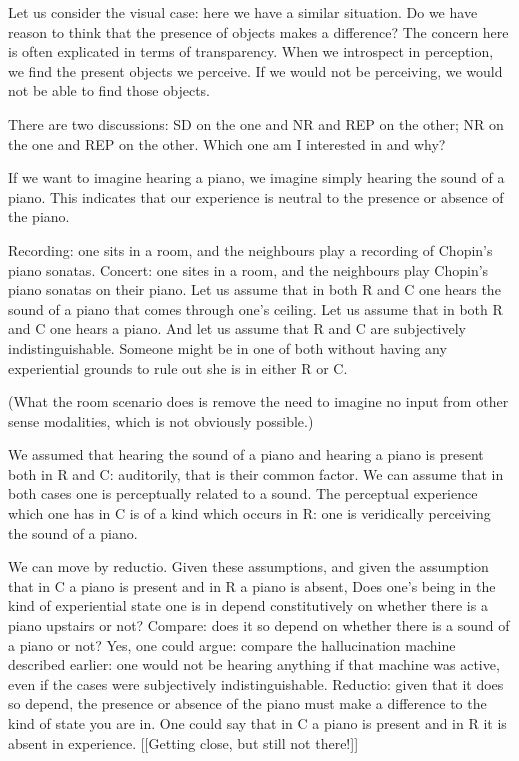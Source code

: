 \documentclass[sloppy, journal, git, bytitle, dodraft]{humapap}
\begin{document}
Let us consider the visual case: here we have a similar situation. Do we have reason to think that the presence of objects makes a difference? The concern here is often explicated in terms of transparency. When we introspect in perception, we find the present objects we perceive. If we would not be perceiving, we would not be able to find those objects.

There are two discussions: SD on the one and NR and REP on the other; NR on the one and REP on the other. Which one am I interested in and why? 

If we want to imagine hearing a piano, we imagine simply hearing the sound of a piano. This indicates that our experience is neutral to the presence or absence of the piano. 




Recording: one sits in a room, and the neighbours play a recording of Chopin's piano sonatas. Concert: one sites in a room, and the neighbours play Chopin's piano sonatas on their piano. Let us assume that in both R and C one hears the sound of a piano that comes through one's ceiling. Let us assume that in both R and C one hears a piano. And let us assume that R and C are subjectively indistinguishable. Someone might be in one of both without having any experiential grounds to rule out she is in either R or C. 

(What the room scenario does is remove the need to imagine no input from other sense modalities, which is not obviously possible.)

We assumed that hearing the sound of a piano and hearing a piano is present both in R and C: auditorily, that is their common factor. We can assume that in both cases one is perceptually related to a sound. The perceptual experience which one has in C is of a kind which occurs in R: one is veridically perceiving the sound of a piano. 

We can move by reductio. Given these assumptions, and given the assumption that in C a piano is present and in R a piano is absent, Does one's being in the kind of experiential state one is in depend constitutively on whether there is a piano upstairs or not? 
Compare: does it so depend on whether there is a sound of a piano or not? Yes, one could argue: compare the hallucination machine described earlier: one would not be hearing anything if that machine was active, even if the cases were subjectively indistinguishable. 
Reductio: given that it does so depend, the presence or absence of the piano must make a difference to the kind of state you are in. One could say that in C a piano is present and in R it is absent in experience. [[Getting close, but still not there!]]
\end{document}
